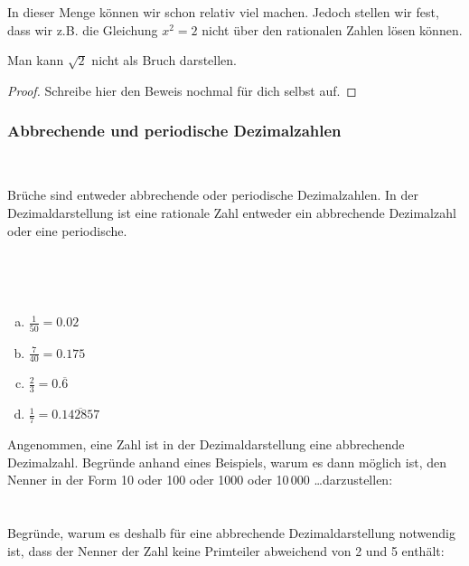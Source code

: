 ~\\~\\
In dieser Menge können wir schon relativ viel machen.
Jedoch stellen wir fest, dass wir z.B. die Gleichung $x^2 = 2$ nicht über den rationalen Zahlen lösen können.

\begin{claim}
 Man kann $\sqrt{2}$ nicht als Bruch darstellen.
\end{claim}

\begin{proof}
 Schreibe hier den Beweis nochmal für dich selbst auf.
 \vfill
\end{proof}

\newpage
\subsubsection{Abbrechende und periodische Dezimalzahlen}
\label{sec:periodic}

~\vspace{.5cm}
\begin{law}{Brüche sind entweder abbrechende oder periodische Dezimalzahlen.}
\label{law:rationalsArePeriodic}
	In der Dezimaldarstellung ist eine rationale Zahl entweder ein abbrechende Dezimalzahl oder eine periodische.
\end{law}
~
\begin{example}~
	\begin{enumerate}[a)]
		\setlength\itemsep{0pt}
		\item $\frac{1}{50} = 0.02$
		\item $\frac{7}{40} = 0.175$
		\item $\frac{2}{3} = 0.\overline{6}$
		\item $\frac{1}{7} = 0.\overline{142857}$
	\end{enumerate}
\end{example}

Angenommen, eine Zahl ist in der Dezimaldarstellung eine abbrechende Dezimalzahl.
Begründe anhand eines Beispiels, warum es dann möglich ist, den Nenner in der Form 10 oder 100 oder 1000 oder 10\,000 \ldots darzustellen:\\~\\
\\

Begründe, warum es deshalb für eine abbrechende Dezimaldarstellung notwendig ist, dass der Nenner der Zahl keine Primteiler abweichend von 2 und 5 enthält:\\~\\

